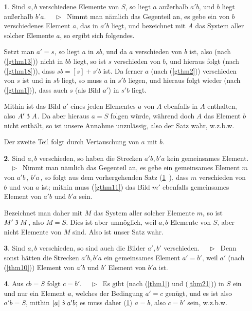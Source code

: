 \documentclass[leqno,hidelinks,a4paper]{article}
\theoremstyle{definition}
\newtheorem{satz}{\protect\satzname}
\newcommand{\satzname}{}
\renewcommand{\satzname}{\hspace{-4pt}.\ Satz}%
\renewcommand{\satzname}{\hspace{-4pt}.\ Theorem}%
\newcommand\Beweis{\medskip \newline $ \phantom{'.'} \rhd \ $}%
\newcommand\TeilVon{\mathrel{\raisebox{0.45ex}{$\mathfrak{3}$}}}
\begin{document}
\begin{paracol}{2}
\newpage

\begin{satz}\label{gthm19}
Sind $a, b$ verschiedene Elemente von $S$, so liegt $a$ außerhalb $a'b$,
und $b$ liegt außerhalb $b'a$.
\Beweis
Nimmt man nämlich das Gegenteil an, es gebe ein von $b$ verschiedenes
Element $a$, das in $a'b$ liegt, und bezeichnet mit $A$ das System aller
solcher Elemente $a$, so ergibt sich folgendes.

Setzt man $a' = s$, so liegt $a$ in $sb$, und da $a$ verschieden von $b$ ist, also
(nach (\ref{gthm13})) nicht in $bb$ liegt, so ist $s$ verschieden von $b$, und
hieraus folgt (nach (\ref{gthm18})), dass $sb = [s] + s'b$ ist. Da ferner $a$
(nach (\ref{gthm2})) verschieden von $s$ ist und in $sb$ liegt, so muss $a$ in
$s'b$ liegen, und hieraus folgt wieder (nach (\ref{gthm1})), dass auch $s$
(als Bild $a'$) in $s'b$ liegt.

Mithin ist das Bild $a'$ eines jeden Elementes $a$ von $A$ ebenfalls in $A$
enthalten, also $A' \TeilVon A$. Da aber hieraus $a = S$ folgen würde, während
doch $A$ das Element $b$ nicht enthält, so ist unsere Annahme unzulässig, also
der Satz wahr, w.z.b.w.

Der zweite Teil folgt durch Vertauschung von $a$ mit $b$.%
\end{satz}

\begin{satz}\label{gthm20}
Sind $a, b$ verschieden, so haben die Strecken $a'b, b'a$ kein gemeinsames
Element.
\Beweis
Nimmt man nämlich das Gegenteil an, es gebe ein gemeinsames Element
$m\,$ von $a'b\,$, $b'a\,$, so folgt aus dem vorhergehenden Satz
(\ref{gthm19}~), dass $m$ verschieden von $b$ und von $a$ ist; mithin muss
(\ref{gthm11}) das Bild $m'$ ebenfalls gemeinsames Element von $a'b$ und $b'a$ sein.

Bezeichnet man daher
mit $M$ das System aller solcher Elemente $m$, so ist $M' \TeilVon M$, also
$M = S$. Dies ist aber unmöglich, weil $a, b$ Elemente von $S$, aber nicht
Elemente von $M$ sind. Also ist unser Satz wahr.
\end{satz}

\begin{satz}\label{gthm21}
Sind $a, b$ verschieden, so sind auch die Bilder $a', b'$ verschieden.
\Beweis
Denn sonst hätten die Strecken $a'b, b'a$ ein gemeinsames Element $a' = b'$, weil
$a'$ (nach (\ref{thm10})) Element von $a'b$ und $b'$ Element von $b'a$ ist.
\end{satz}

\begin{satz}\label{gthm22}
Aus $cb = S$ folgt $c = b'$.
\Beweis
Es gibt (nach (\ref{thm1}) und (\ref{thm21})) in $S$ ein und nur ein Element $a$,
welches der Bedingung $a' = c$ genügt, und es ist also $a'b = S$, mithin $[a] \TeilVon a'b$;
es muss daher (\ref{gthm19}) $a = b$, also $c = b'$ sein, w.z.b.w.
\end{satz}


\end{paracol}
\end{document}
